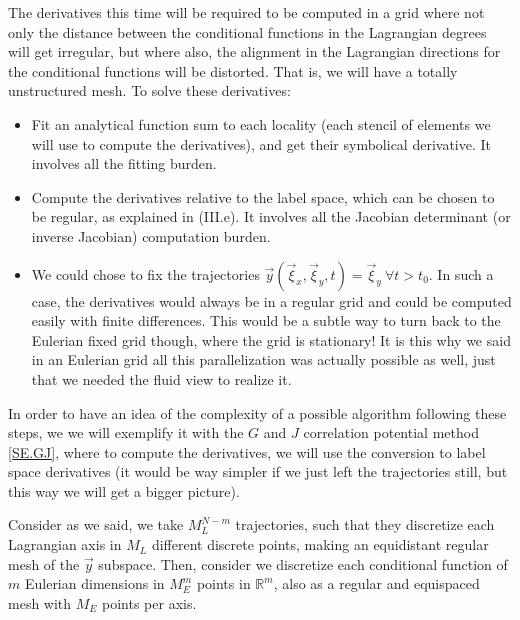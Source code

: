 \documentclass[11pt, a4paper]{article} %
\newcommand{\R}{\mathbb{R}} %
\begin{document}
The derivatives this time will be required to be computed in a grid where not only the distance between the conditional functions in the Lagrangian degrees will get irregular, but where also, the alignment in the Lagrangian directions for the conditional functions will be distorted. That is, we will have a totally unstructured mesh. To solve these derivatives:
\begin{itemize}
\item Fit an analytical function sum to each locality (each stencil of elements we will use to compute the derivatives), and get their symbolical derivative. It involves all the fitting burden.
\item Compute the derivatives relative to the label space, which can be chosen to be regular, as explained in (III.e). It involves all the Jacobian determinant (or inverse Jacobian) computation burden.
\item We could chose to fix the trajectories $\vec{y}(\vec{\xi}_x, \vec{\xi}_y,t)=\vec{\xi}_y\ \forall t>t_0$. In such a case, the derivatives would always be in a regular grid and could be computed easily with finite differences. This would be a subtle way to turn back to the Eulerian fixed grid though, where the grid is stationary! It is this why we said in an Eulerian grid all this parallelization was actually possible as well, just that we needed the fluid view to realize it.
\end{itemize}

In order to have an idea of the complexity of a possible algorithm following these steps, we we will exemplify it with the $G$ and $J$ correlation potential method \eqref{SE.GJ}, where to compute the derivatives, we will use the conversion to label space derivatives (it would be way simpler if we just left the trajectories still, but this way we will get a bigger picture).

Consider as we said, we take $M_L^{N-m}$ trajectories, such that they discretize each Lagrangian axis in $M_{L}$ different discrete points, making an equidistant regular mesh of the $\vec{y}$ subspace. Then, consider we discretize each conditional function of $m$ Eulerian dimensions in $M_E^m$ points in $\R^m$, also as a regular and equispaced mesh with $M_E$ points per axis.
\end{document}
